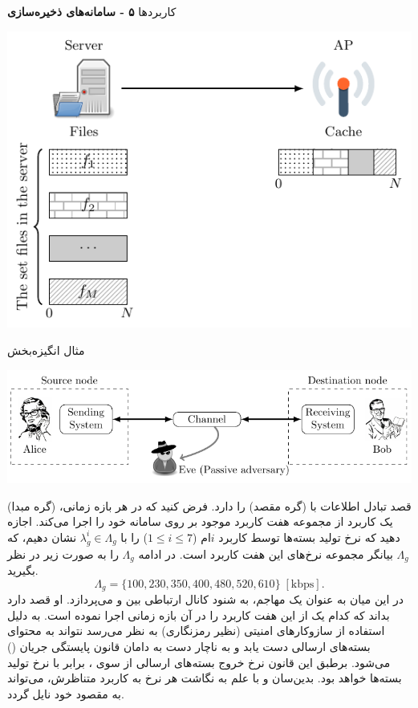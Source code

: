 \documentclass[debug,a0paper,portrait,persian]{xebaposter}
\begin{document}
\begin{poster}
\begin{posterbox}[name=phase2,column=1,span=1]{کاربردها}
\textbf{۵ - سامانه‌های ذخیره‌سازی} 

  \centerline{\includegraphics[width=\linewidth]{images/CachingSystem}}

\end{posterbox}

\begin{posterbox}[name=phase3,column=2,span=1,row=0]{مثال انگیزه‌بخش}
  \centerline{\includegraphics[width=\linewidth]{images/SystemTotalStoryWithCharacter}}


 (گره مبدا)
قصد تبادل اطلاعات با
 (گره مقصد)
را دارد. فرض کنید که
در هر بازه زمانی، یک کاربرد از مجموعه هفت کاربرد موجود بر روی سامانه خود را اجرا می‌کند. اجازه دهید که نرخ تولید بسته‌ها توسط 
کاربرد $i$ام 
($1\leq i \leq 7$) را با $\lambda_g^i\in \Lambda_g$
نشان دهیم، که 
$\Lambda_g$
بیانگر مجموعه‌ نرخ‌های این هفت کاربرد است. در ادامه  $\Lambda_g$ را به صورت زیر در نظر بگیرید. 
\begin{equation*}
\Lambda_g = \{100, 230, 350, 400, 480, 520, 610\}\;[\mathrm{kbps}].
\end{equation*}
در این میان
به عنوان یک مهاجم، به شنود کانال ارتباطی بین
 و 
می‌پردازد. او قصد دارد بداند که 
کدام یک از این هفت کاربرد را در آن بازه زمانی اجرا نموده است. به دلیل استفاده از سازوکارهای امنیتی (نظیر رمزنگاری)
 به نظر می‌رسد  نتواند به محتوای بسته‌های
ارسالی دست یابد و به ناچار دست به دامان  قانون پایستگی جریان
() \cite[قضیه 3.4.5]{Kesidis2007Introduction}
می‌شود. برطبق این قانون نرخ خروج بسته‌های ارسالی از سوی 
،
برابر با نرخ تولید بسته‌ها خواهد بود. بدین‌سان و با علم به  نگاشت هر نرخ به کاربرد متناظرش، می‌تواند  به مقصود خود نایل گردد.


\end{posterbox}
\end{poster}
\end{document}
